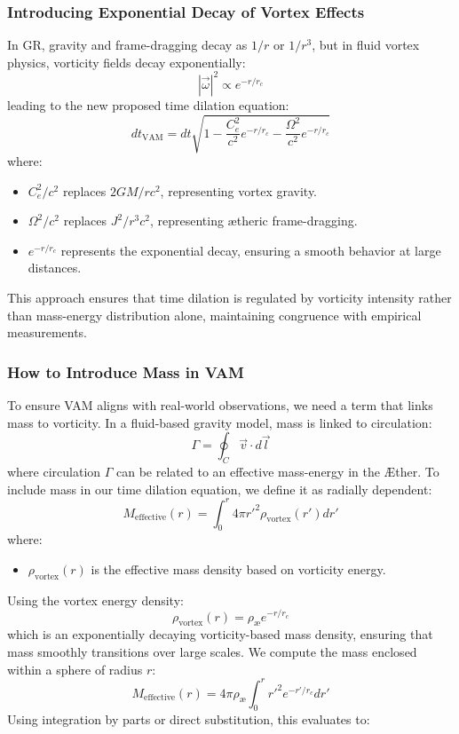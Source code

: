 \subsubsection*{Introducing Exponential Decay of Vortex Effects}
In GR, gravity and frame-dragging decay as $1/r$ or $1/r^3$, but in fluid vortex physics, vorticity fields decay exponentially:
\begin{equation*}
    |\vec{\omega}|^2 \propto e^{-r/r_c}
\end{equation*}
leading to the new proposed time dilation equation:
\begin{equation*}
    dt_\text{VAM} = dt \sqrt{1 - \frac{C_e^2}{c^2} e^{-r/r_c} - \frac{\Omega^2}{c^2} e^{-r/r_c}}
\end{equation*}
where:
\begin{itemize}
    \item $C_e^2/c^2$ replaces $2GM/r c^2$, representing vortex gravity.
    \item $\Omega^2/c^2$ replaces $J^2/r^3 c^2$, representing ætheric frame-dragging.
    \item $e^{-r/r_c}$ represents the exponential decay, ensuring a smooth behavior at large distances.
\end{itemize}
This approach ensures that time dilation is regulated by vorticity intensity rather than mass-energy distribution alone, maintaining congruence with empirical measurements.

\subsubsection*{How to Introduce Mass in VAM}
To ensure VAM aligns with real-world observations, we need a term that links mass to vorticity. In a fluid-based gravity model, mass is linked to circulation:
\begin{equation*}
    \Gamma = \oint_C \vec{v} \cdot d\vec{l}
\end{equation*}
where circulation $\Gamma$ can be related to an effective mass-energy in the Æther. To include mass in our time dilation equation, we define it as radially dependent:
\begin{equation*}
    M_\text{effective}(r) = \int_0^r 4\pi r'^2 \rho_\text{vortex}(r') dr'
\end{equation*}
where:
\begin{itemize}
    \item $\rho_\text{vortex}(r)$ is the effective mass density based on vorticity energy.
\end{itemize}
Using the vortex energy density:
\begin{equation*}
    \rho_\text{vortex}(r) = \rho_\text{\ae} e^{-r / r_c}
\end{equation*}
which is an exponentially decaying vorticity-based mass density, ensuring that mass smoothly transitions over large scales. We compute the mass enclosed within a sphere of radius $r$:
\begin{equation*}
    M_\text{effective}(r) = 4\pi \rho_\text{\ae} \int_0^r r'^2 e^{-r' / r_c} dr'
\end{equation*}
Using integration by parts or direct substitution, this evaluates to:

